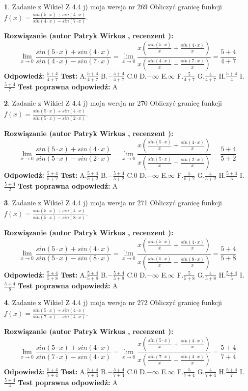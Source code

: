 \documentclass[12pt, a4paper]{article}
\theoremstyle{definition} %
\newtheorem{zad}{}
\newcommand{\zadStart}[1]{\begin{zad}#1\newline}
\newcommand{\zadStop}{\end{zad}}
\newcommand{\rozwStart}[2]{\noindent \textbf{Rozwiązanie (autor #1 , recenzent #2): }\newline}
\newcommand{\rozwStop}{\newline}
\newcommand{\odpStart}{\noindent \textbf{Odpowiedź:}\newline}
\newcommand{\odpStop}{\newline}
\newcommand{\testStart}{\noindent \textbf{Test:}\newline}
\newcommand{\testStop}{\newline}
\newcommand{\kluczStart}{\noindent \textbf{Test poprawna odpowiedź:}\newline}
\newcommand{\kluczStop}{\newline}
\begin{document}
\zadStart{Zadanie z Wikieł Z 4.4 j) moja wersja nr 269}
Obliczyć granicę funkcji $f(x)=\frac{sin(5\cdot x) +sin(4\cdot x)}{sin(4\cdot x) -sin(7\cdot x)}$.
\zadStop
\rozwStart{Patryk Wirkus}{}
$$\lim\limits_{x\to 0}\frac{sin(5\cdot x) +sin(4\cdot x)}{sin(4\cdot x) -sin(7\cdot x)}=\lim\limits_{x\to 0}\frac{x(\frac{sin(5\cdot x)}{x}+\frac{sin(4\cdot x)}{x})}{x(\frac{sin(4\cdot x)}{x}-\frac{sin(7\cdot x)}{x})}=\frac{5+4}{4+7}$$
\rozwStop
\odpStart
$\frac{5+4}{4+7}$
\odpStop
\testStart
A.$\frac{5+4}{4+7}$
B.$-\frac{5+4}{4+7}$
C.$0$
D.$-\infty$
E.$\infty$
F.$\frac{5}{4+7}$
G.$\frac{4}{4+7}$
H.$\frac{5+4}{4}$
I.$\frac{5+4}{7}$
\testStop
\kluczStart
A
\kluczStop



\zadStart{Zadanie z Wikieł Z 4.4 j) moja wersja nr 270}
Obliczyć granicę funkcji $f(x)=\frac{sin(5\cdot x) +sin(4\cdot x)}{sin(5\cdot x) -sin(2\cdot x)}$.
\zadStop
\rozwStart{Patryk Wirkus}{}
$$\lim\limits_{x\to 0}\frac{sin(5\cdot x) +sin(4\cdot x)}{sin(5\cdot x) -sin(2\cdot x)}=\lim\limits_{x\to 0}\frac{x(\frac{sin(5\cdot x)}{x}+\frac{sin(4\cdot x)}{x})}{x(\frac{sin(5\cdot x)}{x}-\frac{sin(2\cdot x)}{x})}=\frac{5+4}{5+2}$$
\rozwStop
\odpStart
$\frac{5+4}{5+2}$
\odpStop
\testStart
A.$\frac{5+4}{5+2}$
B.$-\frac{5+4}{5+2}$
C.$0$
D.$-\infty$
E.$\infty$
F.$\frac{5}{5+2}$
G.$\frac{4}{5+2}$
H.$\frac{5+4}{5}$
I.$\frac{5+4}{2}$
\testStop
\kluczStart
A
\kluczStop



\zadStart{Zadanie z Wikieł Z 4.4 j) moja wersja nr 271}
Obliczyć granicę funkcji $f(x)=\frac{sin(5\cdot x) +sin(4\cdot x)}{sin(5\cdot x) -sin(8\cdot x)}$.
\zadStop
\rozwStart{Patryk Wirkus}{}
$$\lim\limits_{x\to 0}\frac{sin(5\cdot x) +sin(4\cdot x)}{sin(5\cdot x) -sin(8\cdot x)}=\lim\limits_{x\to 0}\frac{x(\frac{sin(5\cdot x)}{x}+\frac{sin(4\cdot x)}{x})}{x(\frac{sin(5\cdot x)}{x}-\frac{sin(8\cdot x)}{x})}=\frac{5+4}{5+8}$$
\rozwStop
\odpStart
$\frac{5+4}{5+8}$
\odpStop
\testStart
A.$\frac{5+4}{5+8}$
B.$-\frac{5+4}{5+8}$
C.$0$
D.$-\infty$
E.$\infty$
F.$\frac{5}{5+8}$
G.$\frac{4}{5+8}$
H.$\frac{5+4}{5}$
I.$\frac{5+4}{8}$
\testStop
\kluczStart
A
\kluczStop



\zadStart{Zadanie z Wikieł Z 4.4 j) moja wersja nr 272}
Obliczyć granicę funkcji $f(x)=\frac{sin(5\cdot x) +sin(4\cdot x)}{sin(7\cdot x) -sin(4\cdot x)}$.
\zadStop
\rozwStart{Patryk Wirkus}{}
$$\lim\limits_{x\to 0}\frac{sin(5\cdot x) +sin(4\cdot x)}{sin(7\cdot x) -sin(4\cdot x)}=\lim\limits_{x\to 0}\frac{x(\frac{sin(5\cdot x)}{x}+\frac{sin(4\cdot x)}{x})}{x(\frac{sin(7\cdot x)}{x}-\frac{sin(4\cdot x)}{x})}=\frac{5+4}{7+4}$$
\rozwStop
\odpStart
$\frac{5+4}{7+4}$
\odpStop
\testStart
A.$\frac{5+4}{7+4}$
B.$-\frac{5+4}{7+4}$
C.$0$
D.$-\infty$
E.$\infty$
F.$\frac{5}{7+4}$
G.$\frac{4}{7+4}$
H.$\frac{5+4}{7}$
I.$\frac{5+4}{4}$
\testStop
\kluczStart
A
\kluczStop
\end{document}
